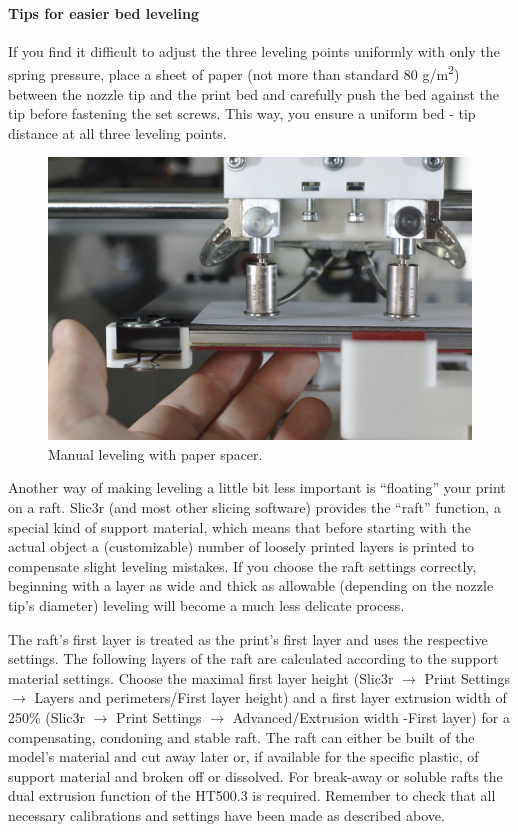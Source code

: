 \paragraph{Tips for easier bed leveling}

If you find it difficult to adjust the three leveling points uniformly with only the spring pressure, place a sheet of paper (not more than standard 80 g/m\textsuperscript{2}) between the nozzle tip and the print bed and carefully push the bed against the tip before fastening the set screws. This way, you ensure a uniform bed - tip distance at all three leveling points.

\begin{figure}[H]
  \centering
  \includegraphics[width=.7\linewidth]{./img/levelingpaperspacer.jpg}
  \caption{Manual leveling with paper spacer.}
\end{figure}

Another way of making leveling a little bit less important is “floating” your print on a raft. Slic3r (and most other slicing software) provides the “raft” function, a special kind of support material, which means that before starting with the actual object a (customizable) number of loosely printed layers is printed to compensate slight leveling mistakes. If you choose the raft settings correctly, beginning with a layer as wide and thick as allowable (depending on the nozzle tip's diameter) leveling will become a much less delicate process.

The raft's first layer is treated as the print's first layer and uses the respective settings. The following layers of the raft are calculated according to the support material settings. Choose the maximal first layer height 
(Slic3r $\rightarrow$ Print Settings $\rightarrow$ Layers and perimeters/First layer height) and a first layer extrusion width of 250\% 
(Slic3r $\rightarrow$ Print Settings $\rightarrow$ Advanced/Extrusion width -First layer) for a compensating, condoning and stable raft.
The raft can either be built of the model's material and cut away later or, if available for the specific plastic, of support material and broken off or dissolved. For break-away or soluble rafts the dual extrusion function of the HT500.3 is required. Remember to check that all necessary calibrations and settings have been made as described above. 

